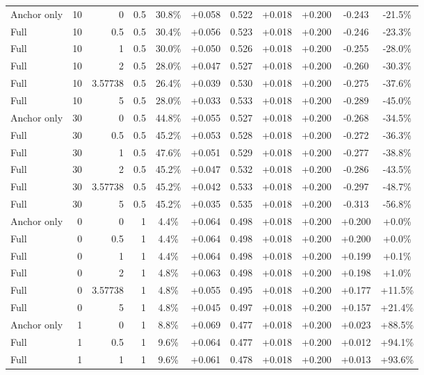 \begin{table}[htbp]
\begin{tabular}{lrrrccccccc}
Anchor only & 10 & 0 & 0.5 & 30.8\% & +0.058 & 0.522 & +0.018 & +0.200 & -0.243 & -21.5\% \\
Full & 10 & 0.5 & 0.5 & 30.4\% & +0.056 & 0.523 & +0.018 & +0.200 & -0.246 & -23.3\% \\
Full & 10 & 1 & 0.5 & 30.0\% & +0.050 & 0.526 & +0.018 & +0.200 & -0.255 & -28.0\% \\
Full & 10 & 2 & 0.5 & 28.0\% & +0.047 & 0.527 & +0.018 & +0.200 & -0.260 & -30.3\% \\
Full & 10 & 3.57738 & 0.5 & 26.4\% & +0.039 & 0.530 & +0.018 & +0.200 & -0.275 & -37.6\% \\
Full & 10 & 5 & 0.5 & 28.0\% & +0.033 & 0.533 & +0.018 & +0.200 & -0.289 & -45.0\% \\
Anchor only & 30 & 0 & 0.5 & 44.8\% & +0.055 & 0.527 & +0.018 & +0.200 & -0.268 & -34.5\% \\
Full & 30 & 0.5 & 0.5 & 45.2\% & +0.053 & 0.528 & +0.018 & +0.200 & -0.272 & -36.3\% \\
Full & 30 & 1 & 0.5 & 47.6\% & +0.051 & 0.529 & +0.018 & +0.200 & -0.277 & -38.8\% \\
Full & 30 & 2 & 0.5 & 45.2\% & +0.047 & 0.532 & +0.018 & +0.200 & -0.286 & -43.5\% \\
Full & 30 & 3.57738 & 0.5 & 45.2\% & +0.042 & 0.533 & +0.018 & +0.200 & -0.297 & -48.7\% \\
Full & 30 & 5 & 0.5 & 45.2\% & +0.035 & 0.535 & +0.018 & +0.200 & -0.313 & -56.8\% \\
Anchor only & 0 & 0 & 1 & 4.4\% & +0.064 & 0.498 & +0.018 & +0.200 & +0.200 & +0.0\% \\
Full & 0 & 0.5 & 1 & 4.4\% & +0.064 & 0.498 & +0.018 & +0.200 & +0.200 & +0.0\% \\
Full & 0 & 1 & 1 & 4.4\% & +0.064 & 0.498 & +0.018 & +0.200 & +0.199 & +0.1\% \\
Full & 0 & 2 & 1 & 4.8\% & +0.063 & 0.498 & +0.018 & +0.200 & +0.198 & +1.0\% \\
Full & 0 & 3.57738 & 1 & 4.8\% & +0.055 & 0.495 & +0.018 & +0.200 & +0.177 & +11.5\% \\
Full & 0 & 5 & 1 & 4.8\% & +0.045 & 0.497 & +0.018 & +0.200 & +0.157 & +21.4\% \\
Anchor only & 1 & 0 & 1 & 8.8\% & +0.069 & 0.477 & +0.018 & +0.200 & +0.023 & +88.5\% \\
Full & 1 & 0.5 & 1 & 9.6\% & +0.064 & 0.477 & +0.018 & +0.200 & +0.012 & +94.1\% \\
Full & 1 & 1 & 1 & 9.6\% & +0.061 & 0.478 & +0.018 & +0.200 & +0.013 & +93.6\% \\

\end{tabular}
\end{table}
